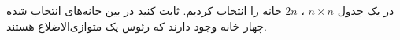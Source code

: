\EXERCISE
در یک جدول
$n \times n$
،
$2n$
خانه را انتخاب کردیم. ثابت کنید در بین خانه‌های انتخاب شده چهار خانه وجود دارند که رئوس یک متوازی‌الاضلاع هستند.
